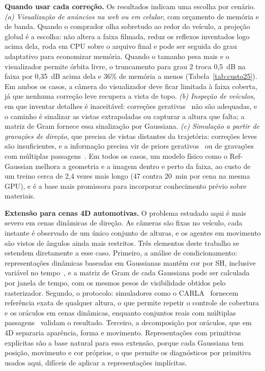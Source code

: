 \textbf{Quando usar cada correção.} Os resultados indicam uma escolha por cenário. \textit{(a) Visualização de anúncios na web ou em celular}, com orçamento de memória e de banda. Quando o comprador olha sobretudo ao redor do veículo, a projeção global é a escolha: não altera a faixa filmada, reduz os reflexos inventados logo acima dela, roda em CPU sobre o arquivo final e pode ser seguida do grau adaptativo para economizar memória. Quando o tamanho pesa mais e o visualizador permite órbita livre, o truncamento para grau 2 troca 0,5~dB na faixa por 0,35~dB acima dela e 36\% de memória a menos (Tabela~\ref{tab:custo25}). Em ambos os casos, a câmera do visualizador deve ficar limitada à faixa coberta, já que nenhuma correção leve recupera a vista de topo. \textit{(b) Inspeção de veículos}, em que inventar detalhes é inaceitável: correções gerativas~\cite{wu2025difix3d,liu2024viewextrapolator} não são adequadas, e o caminho é sinalizar as vistas extrapoladas ou capturar a altura que falta; a matriz de Gram fornece essa sinalização por Gaussiana. \textit{(c) Simulação a partir de gravações de direção}, que precisa de vistas distantes da trajetória: correções leves são insuficientes, e a informação precisa vir de priors gerativos~\cite{wang2025freevs} ou de gravações com múltiplas passagens~\cite{han2025euvs}. Em todos os casos, um modelo físico como o Ref-Gaussian melhora a geometria e a imagem dentro e perto da faixa, ao custo de um treino cerca de 2,4 vezes mais longo (47 contra 20~min por cena na mesma GPU), e é a base mais promissora para incorporar conhecimento prévio sobre materiais.

\textbf{Extensão para cenas 4D automotivas.} O problema estudado aqui é mais severo em cenas dinâmicas de direção. As câmeras são fixas no veículo, cada instante é observado de um único conjunto de alturas, e os agentes em movimento são vistos de ângulos ainda mais restritos. Três elementos deste trabalho se estendem diretamente a esse caso. Primeiro, a análise de condicionamento: representações dinâmicas baseadas em Gaussianas mantêm cor por SH, inclusive variável no tempo~\cite{yan2024streetgs,wu2024gs4d}, e a matriz de Gram de cada Gaussiana pode ser calculada por janela de tempo, com os mesmos pesos de visibilidade obtidos pelo rasterizador. Segundo, o protocolo: simuladores como o CARLA~\cite{dosovitskiy2017carla} fornecem referência exata de qualquer altura, o que permite repetir o controle de cobertura e os oráculos em cenas dinâmicas, enquanto conjuntos reais com múltiplas passagens~\cite{han2025euvs} validam o resultado. Terceiro, a decomposição por oráculos, que em 4D separaria aparência, forma e movimento. Representações com primitivas explícitas são a base natural para essa extensão, porque cada Gaussiana tem posição, movimento e cor próprios, o que permite os diagnósticos por primitiva usados aqui, difíceis de aplicar a representações implícitas.

